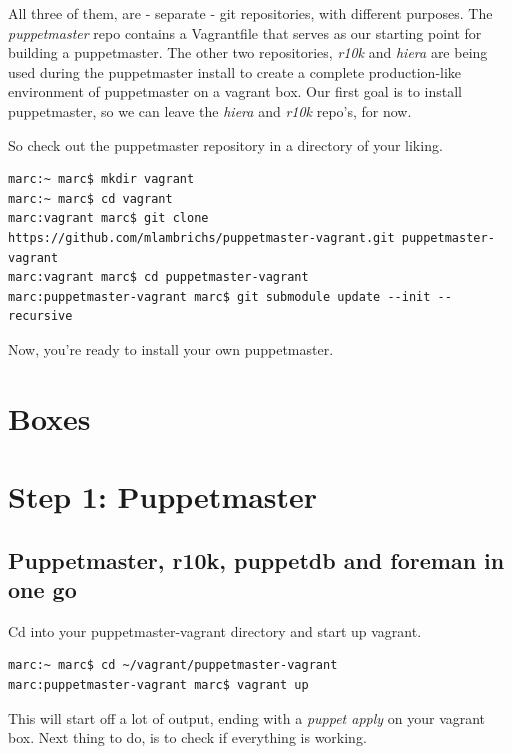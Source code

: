 \documentclass{article}
\begin{document}
\par All three of them, are - separate - git repositories, with different purposes. The \emph{puppetmaster} repo contains a Vagrantfile that serves as our starting point for building a puppetmaster. The other two repositories, \emph{r10k} and \emph{hiera} are being used during the puppetmaster install to create a complete production-like environment of puppetmaster on a vagrant box. Our first goal is to install puppetmaster, so we can leave the \emph{hiera} and \emph{r10k} repo's, for now.

\par So check out the puppetmaster repository in a directory of your liking.

\begin{verbatim}
marc:~ marc$ mkdir vagrant
marc:~ marc$ cd vagrant
marc:vagrant marc$ git clone https://github.com/mlambrichs/puppetmaster-vagrant.git puppetmaster-vagrant
marc:vagrant marc$ cd puppetmaster-vagrant
marc:puppetmaster-vagrant marc$ git submodule update --init --recursive
\end{verbatim}

\par Now, you're ready to install your own puppetmaster.

\section{Boxes}

\section{Step 1: Puppetmaster}

\subsection{Puppetmaster, r10k, puppetdb and foreman in one go}
Cd into your puppetmaster-vagrant directory and start up vagrant.

\begin{verbatim}
marc:~ marc$ cd ~/vagrant/puppetmaster-vagrant
marc:puppetmaster-vagrant marc$ vagrant up
\end{verbatim}

This will start off a lot of output, ending with a \emph{puppet apply} on your vagrant box. Next thing to do, is to check if everything is working.
\end{document}
